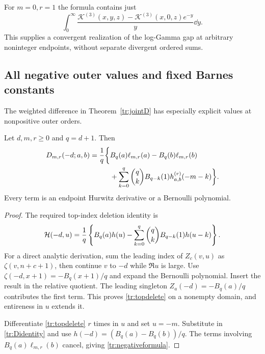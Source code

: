 For $m=0,r=1$ the formula contains just
\[
 \int_0^\infty
 \frac{\mathscr K^{(3)}(x,y,z)-\mathscr K^{(3)}(x,0,z)e^{-y}}y\dd y.
\]
This supplies a convergent realization of the log-Gamma gap at arbitrary
noninteger endpoints, without separate divergent ordered sums.

\subsection{All negative outer values and fixed Barnes constants}

The weighted difference in Theorem~\ref{tr:jointD} has especially
explicit values at nonpositive outer orders.

\begin{theorem}
\label{tr:negativeD}
Let $d,m,r\geq0$ and $q=d+1$. Then
\begin{align}
 D_{m,r}(-d;a,b)
   =\frac1q\biggl\{&
        B_q(a)\ell_{m,r}(a)-B_q(b)\ell_{m,r}(b)\notag\\
       &+\sum_{k=0}^q\binom qk B_{q-k}(1)
                             h_{a,b}^{(r)}(-m-k)\biggr\}.
 \label{tr:negativeformula}
\end{align}
Every term is an endpoint Hurwitz derivative or a Bernoulli polynomial.
\end{theorem}

\begin{proof}
The required top-index deletion identity is
\begin{equation}\label{tr:topdelete}
 \mathcal H(-d,u)=\frac1q\left\{
 B_q(a)h(u)-\sum_{k=0}^q\binom qk B_{q-k}(1)h(u-k)\right\}.
\end{equation}
For a direct analytic derivation, sum the leading index of $Z_c(v,u)$
as $\zeta(v,n+c+1)$, then continue $v$ to $-d$ while $\Re u$ is
large. Use
$\zeta(-d,x+1)=-B_q(x+1)/q$ and expand the Bernoulli polynomial.
Insert the result in the relative quotient. The leading singleton
$Z_a(-d)=-B_q(a)/q$ contributes the first term. This proves
\eqref{tr:topdelete} on a nonempty domain, and entireness in $u$ extends it.

Differentiate \eqref{tr:topdelete} $r$ times in $u$ and set $u=-m$.
Substitute in \eqref{tr:Didentity} and use
$h(-d)=(B_q(a)-B_q(b))/q$. The terms involving
$B_q(a)\ell_{m,r}(b)$ cancel, giving \eqref{tr:negativeformula}.
\end{proof}


